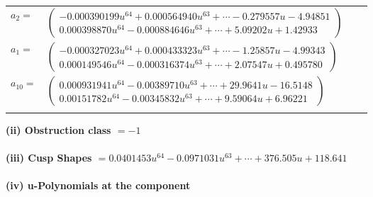 \documentclass[1p]{elsarticle_modified}
\theoremstyle{definition}
\begin{document}
\begin{tabular}{m{7pt} m{180pt} m{7pt} m{180pt} }
\flushright $a_{2}=$&$\begin{pmatrix}-0.000390199 u^{64}+0.000564940 u^{63}+\cdots-0.279557 u-4.94851\\0.000398870 u^{64}-0.000884646 u^{63}+\cdots+5.09202 u+1.42933\end{pmatrix}$ \\
\flushright $a_{1}=$&$\begin{pmatrix}-0.000327023 u^{64}+0.000433323 u^{63}+\cdots-1.25857 u-4.99343\\0.000149546 u^{64}-0.000316374 u^{63}+\cdots+2.07547 u+0.495780\end{pmatrix}$ \\
\flushright $a_{10}=$&$\begin{pmatrix}0.000931941 u^{64}-0.00389710 u^{63}+\cdots+29.9641 u-16.5148\\0.00151782 u^{64}-0.00345832 u^{63}+\cdots+9.59064 u+6.96221\end{pmatrix}$\\&\end{tabular}
\flushleft \textbf{(ii) Obstruction class $= -1$}\\~\\
\flushleft \textbf{(iii) Cusp Shapes $= 0.0401453 u^{64}-0.0971031 u^{63}+\cdots+376.505 u+118.641$}\\~\\
\newpage\renewcommand{\arraystretch}{1}
\flushleft \textbf{(iv) u-Polynomials at the component}\newline \\
\end{document}
